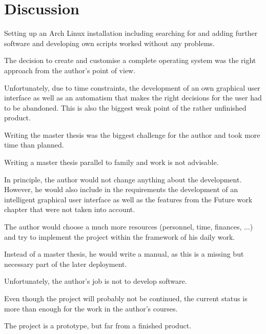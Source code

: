 \chapter{Discussion}
\label{chap:discussion}

Setting up an Arch Linux installation including searching for and adding further software and developing own scripts worked without any problems.

The decision to create and customise a complete operating system was the right approach from the author's point of view.

Unfortunately, due to time constraints, the development of an own graphical user interface as well as an automatism that makes the right decisions for the user had to be abandoned. This is also the biggest weak point of the rather unfinished product.

Writing the master thesis was the biggest challenge for the author and took more time than planned.

Writing a master thesis parallel to family and work is not advisable.

In principle, the author would not change anything about the development. However, he would also include in the requirements the development of an intelligent graphical user interface as well as the features from the Future work chapter that were not taken into account.

The author would choose a much more resources (personnel, time, finances, ...) and try to implement the project within the framework of his daily work.

Instead of a master thesis, he would write a manual, as this is a missing but necessary part of the later deployment.

Unfortunately, the author's job is not to develop software.

Even though the project will probably not be continued, the current status is more than enough for the work in the author's courses.

The project is a prototype, but far from a finished product.
